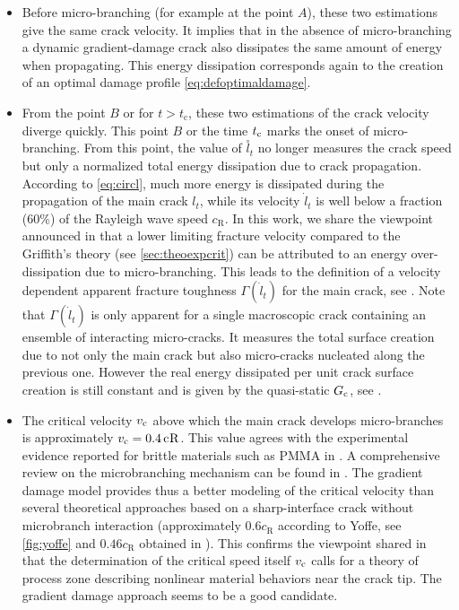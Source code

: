\begin{itemize}
\item Before micro-branching (for example at the point $A$), these two estimations give the same crack velocity. It implies that in the absence of micro-branching a dynamic gradient-damage crack also dissipates the same amount of energy when propagating. This energy dissipation corresponds again to the creation of an optimal damage profile \eqref{eq:defoptimaldamage}.

\item From the point $B$ or for $t>t_\mathrm{c}$, these two estimations of the crack velocity diverge quickly. This point $B$ or the time $t_{\mathrm{c}}$ marks the onset of micro-branching. From this point, the value of $\overset{\circ}{l}_t$ no longer measures the crack speed but only a normalized total energy dissipation due to crack propagation. According to \eqref{eq:circl}, much more energy is dissipated during the propagation of the main crack $l_t$, while its velocity $\dot{l}_t$ is well below a fraction (60\%) of the Rayleigh wave speed $c_\mathrm{R}$. In this work, we share the viewpoint announced in \cite{SharonFineberg:1996} that a lower limiting fracture velocity compared to the Griffith's theory (see \cref{sec:theoexpcrit}) can be attributed to an energy over-dissipation due to micro-branching. This leads to the definition of a velocity dependent apparent fracture toughness $\Gamma(\dot{l}_t)$ for the main crack, see \cite{SharonFineberg:1996,SharonFineberg:1999}. Note that $\Gamma(\dot{l}_t)$ is only apparent for a single macroscopic crack containing an ensemble of interacting micro-cracks. It measures the total surface creation due to not only the main crack but also micro-cracks nucleated along the previous one. However the real energy dissipated per unit crack surface creation is still constant and is given by the quasi-static $G_\mathrm{c}$, see \cite{SharonFineberg:1996}.

\item The critical velocity $v_{\mathrm{c}}$ above which the main crack develops micro-branches is approximately $v_{\mathrm{c}}=\SI{0.4}{c_\mathrm{R}}$. This value agrees with the experimental evidence reported for brittle materials such as PMMA in \cite{FinebergGrossMarderSwinney:1992a}. A comprehensive review on the microbranching mechanism can be found in \cite{FinebergMarder:1999}. The gradient damage model provides thus a better modeling of the critical velocity than several theoretical approaches based on a sharp-interface crack without microbranch interaction (approximately $0.6c_\mathrm{R}$ according to Yoffe, see \cref{fig:yoffe} and $0.46c_\mathrm{R}$ obtained in \cite{KatzavAdda-BediaArias:2007}). This confirms the viewpoint shared in \cite{Ravi-Chandar:1998} that the determination of the critical speed itself $v_{\mathrm{c}}$ calls for a theory of process zone describing nonlinear material behaviors near the crack tip. The gradient damage approach seems to be a good candidate.
\end{itemize}

